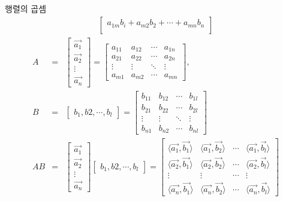 \documentclass[10pt,t]{beamer}
\begin{document}
\begin{frame}{행렬의 곱셈}
\begin{eqnarray*}
\begin{bmatrix}
        a_{1m}b_i + a_{m2}b_2 + \cdots + a_{mn}b_n \\
    \end{bmatrix}
\end{eqnarray*}
\pagebreak
\begin{eqnarray*}
    A &=& \begin{bmatrix}
        \vec{a_1}\\
        \vec{a_2}\\
        \vdots \\
        \vec{a_n}
    \end{bmatrix} = \begin{bmatrix}
        a_{11} & a_{12} & \cdots & a_{1n} \\
        a_{21} & a_{22} & \cdots & a_{2n} \\
         \vdots & \vdots & \ddots & \vdots \\
        a_{m1} & a_{m2} & \cdots & a_{mn} 
    \end{bmatrix}, \\
    B &=& \begin{bmatrix}
        b_1, b2, \cdots, b_l
    \end{bmatrix} = \begin{bmatrix}
        b_{11} & b_{12} & \cdots & b_{1l} \\
        b_{21} & b_{22} & \cdots & b_{2l} \\
         \vdots & \vdots & \ddots & \vdots \\
        b_{n1} & b_{n2} & \cdots & b_{nl} 
    \end{bmatrix}\\
    AB &=& \begin{bmatrix}
        \vec{a_1}\\
        \vec{a_2}\\
        \vdots \\
        \vec{a_n}
    \end{bmatrix}  \begin{bmatrix}
        b_1, b2, \cdots, b_l
    \end{bmatrix} = \begin{bmatrix}
        \langle \vec{a_1}, \vec{b_1} \rangle & \langle \vec{a_1}, \vec{b_2} \rangle & \cdots & \langle \vec{a_1}, \vec{b_l} \rangle\\
        \langle \vec{a_2}, \vec{b_1} \rangle & \langle \vec{a_2}, \vec{b_2} \rangle & \cdots & \langle \vec{a_2}, \vec{b_l} \rangle\\
        \vdots & \vdots& \cdots &\vdots\\
        \langle \vec{a_n}, \vec{b_1} \rangle & \langle \vec{a_n}, \vec{b_2} \rangle & \cdots & \langle \vec{a_n}, \vec{b_l} \rangle
    \end{bmatrix} 
\end{eqnarray*}


\end{frame}
\end{document}
